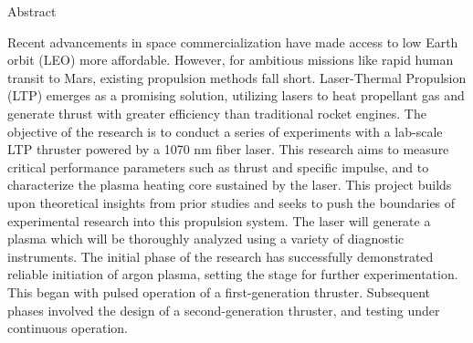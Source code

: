 \begin{plainchp}{Abstract}

    Recent advancements in space commercialization have made access to low Earth orbit (LEO) more affordable. However, for ambitious missions like rapid human transit to Mars, existing propulsion methods fall short. Laser-Thermal Propulsion (LTP) emerges as a promising solution, utilizing lasers to heat propellant gas and generate thrust with greater efficiency than traditional rocket engines. The objective of the research is to conduct a series of experiments with a lab-scale LTP thruster powered by a 1070 nm fiber laser. This research aims to measure critical performance parameters such as thrust and specific impulse, and to characterize the plasma heating core sustained by the laser. This project builds upon theoretical insights from prior studies and seeks to push the boundaries of experimental research into this propulsion system. The laser will generate a plasma which will be thoroughly analyzed using a variety of diagnostic instruments. The initial phase of the research has successfully demonstrated reliable initiation of argon plasma, setting the stage for further experimentation. This began with pulsed operation of a first-generation thruster. Subsequent phases involved the design of a second-generation thruster, and testing under continuous operation.

\end{plainchp}